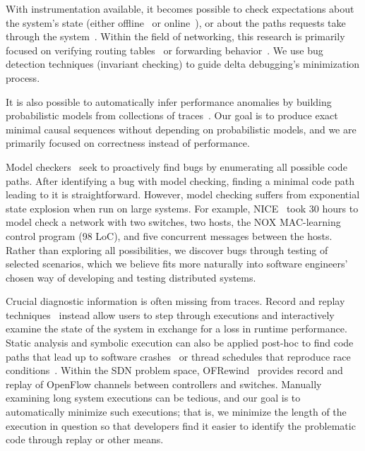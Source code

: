\vspace{0.05in}
 With instrumentation available, it becomes possible
to check expectations about the
system's state (either offline~\cite{Liu07widschecker} or online~\cite{d3s,dao2009live}), or about the paths requests take through
the system~\cite{pip}. Within the field of networking, this research is
primarily focused on verifying routing tables~\cite{hsa,hsa_realtime,anteater,khurshid2012veriflow}
or forwarding behavior~\cite{Zeng:2012:ATP:2413176.2413205,libra}.
We use bug detection techniques (invariant checking) to guide delta debugging's minimization
process.

It is also possible to automatically infer
performance anomalies by building probabilistic models from
collections of traces~\cite{barham2004using,Chen02pinpoint:problem}.
Our goal is to produce exact minimal causal sequences without
depending on probabilistic models, and we are primarily focused on correctness
instead of performance.

Model checkers~\cite{killian2007life,nice} seek to
proactively find bugs by enumerating all possible code paths.
After identifying a bug with model checking, finding a minimal code path leading to it is
straightforward. However, model checking suffers from exponential
state explosion when run on large systems. For example, NICE~\cite{nice} took 30 hours to
model check a network with two switches, two hosts, the NOX MAC-learning
control program (98 LoC), and five concurrent
messages between the hosts. Rather than exploring all
possibilities, we discover bugs through testing of selected scenarios,
which we believe fits more naturally into software engineers' chosen
way of developing and testing distributed systems.

\vspace{0.05in}
 Crucial diagnostic information is often missing from traces.
Record and replay techniques~\cite{Geels:2006:RDD:1267359.1267386,lin2009towards}
instead allow users to step through executions and interactively examine the
state of the system in exchange for a loss in runtime performance.
Static analysis and symbolic execution can also be applied post-hoc %
to find code paths that lead up to software
crashes~\cite{Yuan:2010:SED:1736020.1736038} or thread schedules that reproduce
race conditions~\cite{Zamfir:2010:EST:1755913.1755946}.
Within the SDN problem space, OFRewind~\cite{ofrewind} provides
record and replay of OpenFlow channels between controllers and switches.
Manually examining long system executions can be tedious, and our goal is to
automatically minimize such executions; that is, we minimize the length of
the execution in question so that developers find it easier to identify the
problematic code through replay or other means.

